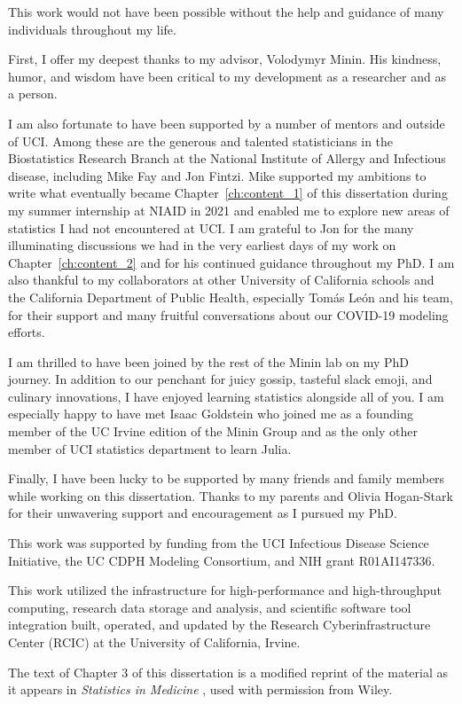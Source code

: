 \acknowledgments
{



This work would not have been possible without the help and guidance of many individuals throughout my life.

First, I offer my deepest thanks to my advisor, Volodymyr Minin.
His kindness, humor, and wisdom have been critical to my development as a researcher and as a person.

I am also fortunate to have been supported by a number of mentors and  outside of UCI.
Among these are the generous and talented statisticians in the Biostatistics Research Branch at the National Institute of Allergy and Infectious disease, including Mike Fay and Jon Fintzi.
Mike supported my ambitions to write what eventually became Chapter~\ref{ch:content_1} of this dissertation during my summer internship at NIAID in 2021 and enabled me to explore new areas of statistics I had not encountered at UCI.
I am grateful to Jon for the many illuminating discussions we had in the very earliest days of my work on Chapter~\ref{ch:content_2} and for his continued guidance throughout my PhD.
I am also thankful to my collaborators at other University of California schools and the California Department of Public Health, especially Tom\'{a}s Le\'{o}n and his team, for their support and many fruitful conversations about our COVID-19 modeling efforts.

I am thrilled to have been joined by the rest of the Minin lab on my PhD journey.
In addition to our penchant for juicy gossip, tasteful slack emoji, and culinary innovations, I have enjoyed learning statistics alongside all of you.
I am especially happy to have met Isaac Goldstein who joined me as a founding member of the UC Irvine edition of the Minin Group and as the only other member of UCI statistics department to learn Julia.

Finally, I have been lucky to be supported by many friends and family members while working on this dissertation.
Thanks to my parents and Olivia Hogan-Stark for their unwavering support and encouragement as I pursued my PhD.

This work was supported by funding from the UCI Infectious Disease Science Initiative, the UC CDPH Modeling Consortium, and NIH grant R01AI147336.

This work utilized the infrastructure for high-performance and high-throughput computing, research data storage and analysis, and scientific software tool integration built, operated, and updated by the Research Cyberinfrastructure Center (RCIC) at the University of California, Irvine.

The text of Chapter 3 of this dissertation is a modified reprint of the material as it appears in \textit{Statistics in Medicine} \citep{Bayer2023Confidence}, used with permission from Wiley.
}


